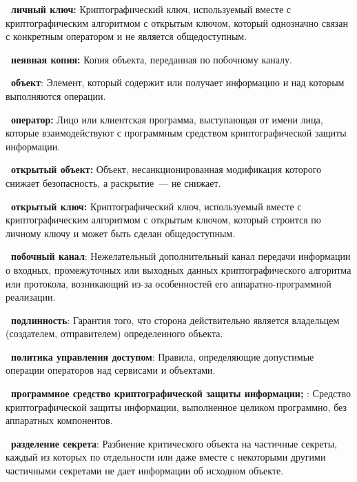 {\bf \thedefctr~личный ключ:}
Криптографический ключ, используемый
вместе с криптографическим алгоритмом с открытым ключом, 
который однозначно связан с конкретным оператором 
и не является общедоступным.


{\bf \thedefctr~неявная копия:}
Копия объекта, переданная по побочному каналу.

{\bf \thedefctr~объект}: 
Элемент, который содержит или получает информацию
и над которым выполняются операции.

{\bf \thedefctr~оператор:}
Лицо или клиентская программа, выступающая от имени лица, 
которые взаимодействуют с программным средством криптографической защиты 
информации.

{\bf \thedefctr~открытый объект:} 
Объект, несанкционированная модификация 
которого снижает безопасность, 
а раскрытие~--- не снижает.

{\bf \thedefctr~открытый ключ:}
Криптографический ключ, используемый 
вместе с криптографическим алгоритмом с открытым ключом, 
который строится по личному ключу  
и может быть сделан общедоступным.


{\bf \thedefctr~побочный канал}:
Нежелательный дополнительный канал передачи информации о 
входных, промежуточных или выходных данных 
криптографического алгоритма или протокола, 
возникающий из-за особенностей его 
аппаратно-программной реализации.

{\bf \thedefctr~подлинность}:
Гарантия того, что сторона действительно 
является владельцем (создателем, отправителем) 
определенного объекта.

{\bf \thedefctr~политика управления доступом}:
Правила, определяющие допустимые операции 
операторов над сервисами и объектами.

{\bf \thedefctr~программное средство криптографической защиты информации;
\TOE}:
Средство криптографической защиты информации, выполненное целиком 
программно, без аппаратных компонентов.

{\bf \thedefctr~разделение секрета}:
Разбиение критического объекта на частичные секреты, 
каждый из которых по отдельности или даже вместе с некоторыми
другими частичными секретами не дает информации об исходном объекте.

